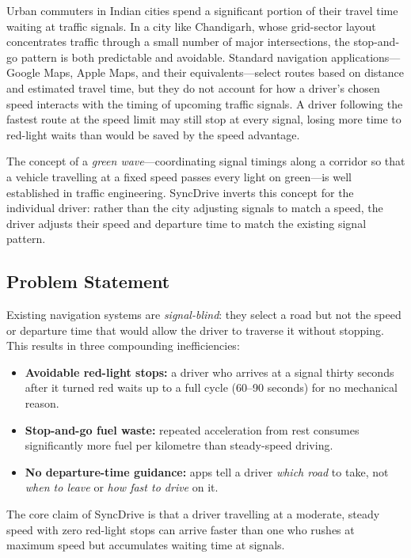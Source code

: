 \documentclass[12pt,a4paper]{report}
\begin{document}
Urban commuters in Indian cities spend a significant portion of their travel
time waiting at traffic signals. In a city like Chandigarh, whose grid-sector
layout concentrates traffic through a small number of major intersections, the
stop-and-go pattern is both predictable and avoidable. Standard navigation
applications---Google Maps, Apple Maps, and their equivalents---select routes
based on distance and estimated travel time, but they do not account for how a
driver's chosen speed interacts with the timing of upcoming traffic signals. A
driver following the fastest route at the speed limit may still stop at every
signal, losing more time to red-light waits than would be saved by the speed
advantage.

The concept of a \textit{green wave}---coordinating signal timings along a
corridor so that a vehicle travelling at a fixed speed passes every light on
green---is well established in traffic engineering. SyncDrive inverts this
concept for the individual driver: rather than the city adjusting signals to
match a speed, the driver adjusts their speed and departure time to match the
existing signal pattern.

\subsection{Problem Statement}

Existing navigation systems are \textit{signal-blind}: they select a road but
not the speed or departure time that would allow the driver to traverse it
without stopping. This results in three compounding inefficiencies:

\begin{itemize}
  \item \textbf{Avoidable red-light stops:} a driver who arrives at a signal
        thirty seconds after it turned red waits up to a full cycle (60--90
        seconds) for no mechanical reason.
  \item \textbf{Stop-and-go fuel waste:} repeated acceleration from rest
        consumes significantly more fuel per kilometre than steady-speed
        driving.
  \item \textbf{No departure-time guidance:} apps tell a driver
        \textit{which road} to take, not \textit{when to leave} or
        \textit{how fast to drive} on it.
\end{itemize}

The core claim of SyncDrive is that a driver travelling at a moderate, steady
speed with zero red-light stops can arrive faster than one who rushes at
maximum speed but accumulates waiting time at signals.
\end{document}
